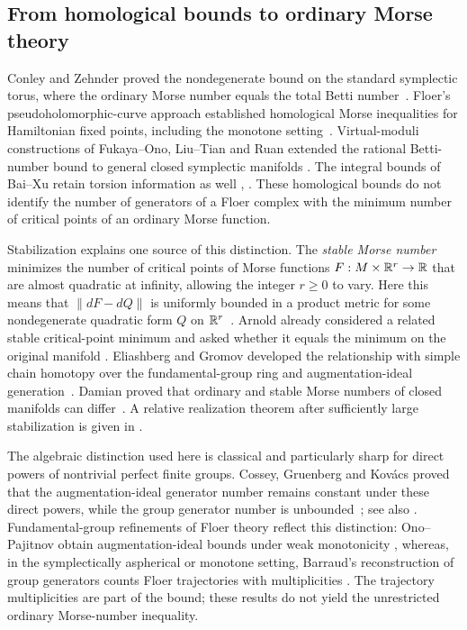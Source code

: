 \subsection{From homological bounds to ordinary Morse theory}
Conley and Zehnder proved the nondegenerate bound on the standard
symplectic torus, where the ordinary Morse number equals the total Betti
number~\cite{ConleyZehnder1983}.
Floer's pseudoholomorphic-curve approach established homological Morse
inequalities for Hamiltonian fixed points, including the monotone
setting~\cite{Floer1989}. Virtual-moduli constructions of Fukaya--Ono,
Liu--Tian and Ruan extended the rational Betti-number bound to general
closed symplectic manifolds
\cite{FukayaOno1999,LiuTian1998,Ruan1999}.
The integral bounds of Bai--Xu retain torsion information as well
\cite[Theorem~A]{BaiXu2022}, \cite[Corollary~1.2]{BaiXu2026}.
These homological bounds do not identify the number of generators of a
Floer complex with the minimum number of critical points of an ordinary
Morse function.

Stabilization explains one source of this distinction. The
\emph{stable Morse number} minimizes the number of critical points of
Morse functions $F:M\times\mathbb R^r\to\mathbb R$ that are almost quadratic at
infinity, allowing the integer $r\geq0$ to vary. Here this means that $\|dF-dQ\|$ is
uniformly bounded in a product metric for some nondegenerate quadratic
form $Q$ on $\mathbb R^r$~\cite[Section~2.1]{DRG2017}.
Arnold already considered a related stable critical-point minimum and
asked whether it equals the minimum on the original manifold
\cite[Section~5]{Arnold1986}.
Eliashberg and Gromov developed the relationship with simple chain
homotopy over the fundamental-group ring and augmentation-ideal
generation~\cite[Sections~0.2.2 and~0.2.5]{EliashbergGromov1998}.
Damian proved that ordinary and stable Morse numbers of closed manifolds
can differ~\cite{Damian2002}. A relative realization theorem after
sufficiently large stabilization is given in
\cite[Proposition~2.9]{DRG2018}.

The algebraic distinction used here is classical and particularly sharp
for direct powers of nontrivial perfect finite groups. Cossey, Gruenberg and
Kov\'acs proved that the augmentation-ideal generator number remains
constant under these direct powers, while the group generator number
is unbounded~\cite[Theorems~1--2]{CGK1974}; see also
\cite[Sections~1--2]{GruenbergLinnell}.
Fundamental-group refinements of Floer theory reflect this distinction:
Ono--Pajitnov obtain augmentation-ideal bounds under weak monotonicity
\cite[Theorem~5.7]{OnoPajitnov2016}, whereas, in the symplectically
aspherical or monotone setting, Barraud's reconstruction of group
generators counts Floer trajectories with multiplicities
\cite[Theorem~1.3 and Remark~3]{Barraud2018}.
The trajectory multiplicities are part of the bound; these results do
not yield the unrestricted ordinary Morse-number inequality.

